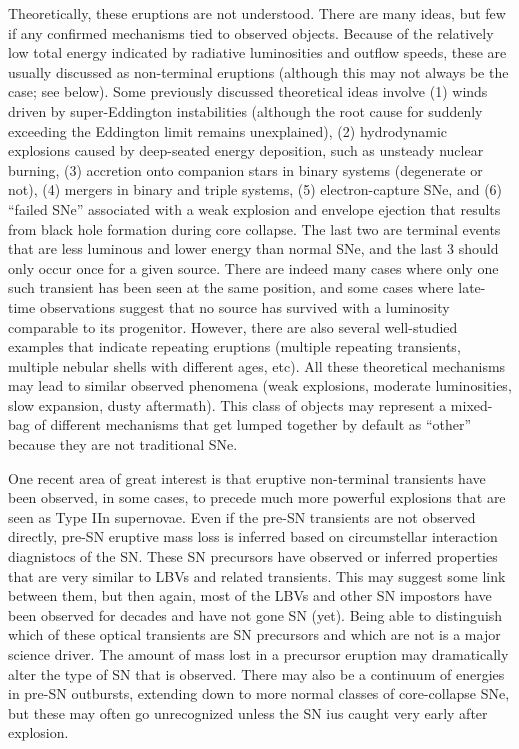 Theoretically, these eruptions are not understood.  There are many
ideas, but few if any confirmed mechanisms tied to observed
objects. Because of the relatively low total energy indicated by
radiative luminosities and outflow speeds, these are usually discussed
as non-terminal eruptions (although this may not always be the case;
see below).  Some previously discussed theoretical ideas involve (1)
winds driven by super-Eddington instabilities (although the root cause
for suddenly exceeding the Eddington limit remains unexplained), (2)
hydrodynamic explosions caused by deep-seated energy deposition, such
as unsteady nuclear burning, (3) accretion onto companion stars in
binary systems (degenerate or not), (4) mergers in binary and triple
systems, (5) electron-capture SNe, and (6) ``failed SNe'' associated
with a weak explosion and envelope ejection that results from black
hole formation during core collapse.  The last two are terminal events
that are less luminous and lower energy than normal SNe, and the last
3 should only occur once for a given source.  There are indeed many
cases where only one such transient has been seen at the same
position, and some cases where late-time observations suggest that no
source has survived with a luminosity comparable to its progenitor.
However, there are also several well-studied examples that indicate
repeating eruptions (multiple repeating transients, multiple nebular
shells with different ages, etc).  All these theoretical mechanisms
may lead to similar observed phenomena (weak explosions, moderate
luminosities, slow expansion, dusty aftermath). This class of objects
may represent a mixed-bag of different mechanisms that get lumped
together by default as ``other'' because they are not traditional SNe.

One recent area of great interest is that eruptive non-terminal
transients have been observed, in some cases, to precede much more
powerful explosions that are seen as Type IIn supernovae.  Even if the
pre-SN transients are not observed directly, pre-SN eruptive mass loss
is inferred based on circumstellar interaction diagnistocs of the SN.
These SN precursors have observed or inferred properties that are very
similar to LBVs and related transients.  This may suggest some link
between them, but then again, most of the LBVs and other SN impostors
have been observed for decades and have not gone SN (yet).  Being able
to distinguish which of these optical transients are SN precursors and
which are not is a major science driver.  The amount of mass lost in a
precursor eruption may dramatically alter the type of SN that is
observed.  There may also be a continuum of energies in pre-SN
outbursts, extending down to more normal classes of core-collapse SNe,
but these may often go unrecognized unless the SN ius caught very
early after explosion.

